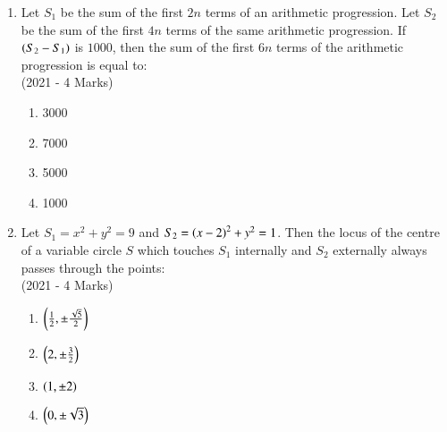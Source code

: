 \documentclass[journal]{IEEEtran}
\begin{document}
\begin{enumerate}
{        	\begin{multicols}{4}
        		\begin{enumerate}
					\item 7
					
					\item 5
					
					\item 2
					
					\item 3
        		\end{enumerate}
        	\end{multicols}
        	
        }
 	\item{
			Let $S_1$ be the sum of the first $2n$ terms of an arithmetic progression. Let $S_2$ be the sum of the first $4n$ terms of the same arithmetic progression. If $\left(S_2 - S_1\right)$ is $1000$, then the sum of the first $6n$ terms of the arithmetic progression is equal to:\\ \text{ }
			\hfill
			{(2021 - 4 Marks)}
			
			\begin{multicols}{4}
				\begin{enumerate}
					\item 3000
					\item 7000
					\item 5000
					\item 1000
				\end{enumerate}
			\end{multicols}
			
		}
 	\item{
			Let $S_1 = x^2 + y^2 = 9$ and $S_2 = \left(x - 2\right)^2 + y^2 = 1$. Then the locus of the centre of a variable circle $S$ which touches $S_1$ internally and $S_2$ externally always passes through the points:\\ \text{ }
			\hfill
			{(2021 - 4 Marks)}
			
			\begin{multicols}{4}
				\begin{enumerate}
					\item $\left( \frac{1}{2}, \pm \frac{\sqrt{5}}{2}\right)$
					\item $\left( 2, \pm \frac{3}{2}\right)$
					\item $\left( 1, \pm 2 \right)$
					\item $\left( 0, \pm \sqrt{3}\right)$
				\end{enumerate}
			\end{multicols}
			
}
\end{enumerate}
\end{document}
